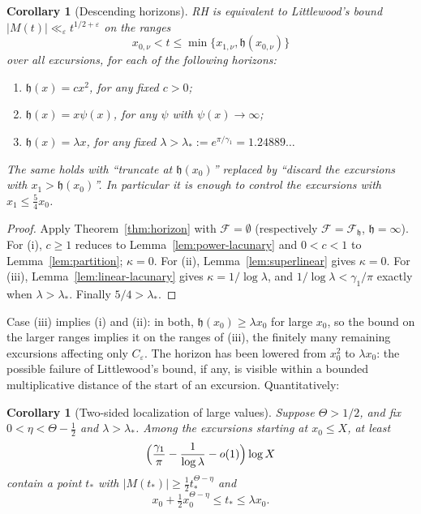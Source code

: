 \documentclass[11pt]{amsart}
\numberwithin{equation}{section}
\theoremstyle{plain}
\newtheorem{corollary}[theorem]{Corollary}
\theoremstyle{definition}
\theoremstyle{remark}
\newcommand{\eps}{\varepsilon}
\newcommand{\F}{\mathcal{F}}
\begin{document}
\begin{corollary}[Descending horizons]
\label{cor:descending}
\label{cor:linear-ordinary-RH}
RH is equivalent to Littlewood's bound
$|M(t)|\ll_\eps t^{1/2+\eps}$ on the ranges
\[
x_{0,\nu}<t\le\min\{x_{1,\nu},\mathfrak h(x_{0,\nu})\}
\]
over all excursions, for each of the following horizons:
\begin{enumerate}[label=\textup{(\roman*)}]
\item $\mathfrak h(x)=cx^2$, for any fixed $c>0$;
\item $\mathfrak h(x)=x\psi(x)$, for any $\psi$ with $\psi(x)\to\infty$;
\item $\mathfrak h(x)=\lambda x$, for any fixed $\lambda>\lambda_*:=e^{\pi/\gamma_1}=1.24889\ldots$
\end{enumerate}
The same holds with ``truncate at $\mathfrak h(x_0)$'' replaced by ``discard the
excursions with $x_1>\mathfrak h(x_0)$''. In particular it is enough to control the
excursions with $x_1\le\frac54x_0$.
\end{corollary}

\begin{proof}
Apply Theorem~\ref{thm:horizon} with $\F=\emptyset$ (respectively
$\F=\F_{\mathfrak h}$, $\mathfrak h=\infty$). For (i), $c\ge1$ reduces to
Lemma~\ref{lem:power-lacunary} and $0<c<1$ to Lemma~\ref{lem:partition};
$\kappa=0$. For (ii), Lemma~\ref{lem:superlinear} gives $\kappa=0$. For
(iii), Lemma~\ref{lem:linear-lacunary} gives $\kappa=1/\log\lambda$, and
$1/\log\lambda<\gamma_1/\pi$ exactly when $\lambda>\lambda_*$. Finally
$5/4>\lambda_*$.
\end{proof}

Case (iii) implies (i) and (ii): in both, $\mathfrak h(x_0)\ge\lambda x_0$ for large
$x_0$, so the bound on the larger ranges implies it on the ranges of (iii),
the finitely many remaining excursions affecting only $C_\eps$. The horizon has
been lowered from $x_0^2$ to $\lambda x_0$: the possible failure of
Littlewood's bound, if any, is visible within a bounded multiplicative
distance of the start of an excursion. Quantitatively:

\begin{corollary}[Two-sided localization of large values]
\label{cor:two-sided}
Suppose $\Theta>1/2$, and fix $0<\eta<\Theta-\frac12$ and $\lambda>\lambda_*$.
Among the excursions starting at $x_0\le X$, at least
\[
\Bigl(\frac{\gamma_1}{\pi}-\frac1{\log\lambda}-o(1)\Bigr)\log X
\]
contain a point $t_*$ with $|M(t_*)|\ge\frac12t_*^{\Theta-\eta}$ and
\[
x_0+\tfrac12x_0^{\Theta-\eta}\le t_*\le\lambda x_0 .
\]
\end{corollary}
\end{document}

